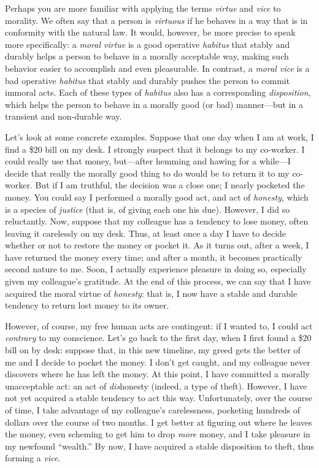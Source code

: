 \documentclass[
  12pt,
]{memoir}
\begin{document}
Perhaps you are more familiar with applying the terms \emph{virtue} and
\emph{vice} to morality. We often say that a person is \emph{virtuous}
if he behaves in a way that is in conformity with the natural law. It
would, however, be more precise to speak more specifically: a
\emph{moral virtue} is a good operative \emph{habitus} that stably and
durably helps a person to behave in a morally acceptable way, making
such behavior easier to accomplish and even pleasurable. In contrast, a
\emph{moral vice} is a bad operative \emph{habitus} that stably and
durably pushes the person to commit immoral acts. Each of these types of
\emph{habitus} also has a corresponding \emph{disposition}, which helps
the person to behave in a morally good (or bad) manner---but in a
transient and non-durable way.

Let's look at some concrete examples. Suppose that one day when I am at
work, I find a \$20 bill on my desk. I strongly suspect that it belongs
to my co-worker. I could really use that money, but---after hemming and
hawing for a while---I decide that really the morally good thing to do
would be to return it to my co-worker. But if I am truthful, the
decision was a close one; I nearly pocketed the money. You could say I
performed a morally good act, and act of \emph{honesty}, which is a
species of \emph{justice} (that is, of giving each one his due).
However, I did so reluctantly. Now, suppose that my colleague has a
tendency to lose money, often leaving it carelessly on my desk. Thus, at
least once a day I have to decide whether or not to restore the money or
pocket it. As it turns out, after a week, I have returned the money
every time; and after a month, it becomes practically second nature to
me. Soon, I actually experience pleasure in doing so, especially given
my colleague's gratitude. At the end of this process, we can say that I
have acquired the moral virtue of \emph{honesty}: that is, I now have a
stable and durable tendency to return lost money to its owner.

However, of course, my free human acts are contingent: if I wanted to, I
could act \emph{contrary} to my conscience. Let's go back to the first
day, when I first found a \$20 bill on by desk: suppose that, in this
new timeline, my greed gets the better of me and I decide to pocket the
money. I don't get caught, and my colleague never discovers where he has
left the money. At this point, I have committed a morally unacceptable
act: an act of \emph{dis}honesty (indeed, a type of theft). However, I
have not yet acquired a stable tendency to act this way. Unfortunately,
over the course of time, I take advantage of my colleague's
carelessness, pocketing hundreds of dollars over the course of two
months. I get better at figuring out where he leaves the money, even
scheming to get him to drop \emph{more} money, and I take pleasure in my
newfound ``wealth.'' By now, I have acquired a stable disposition to
theft, thus forming a \emph{vice}.
\end{document}
